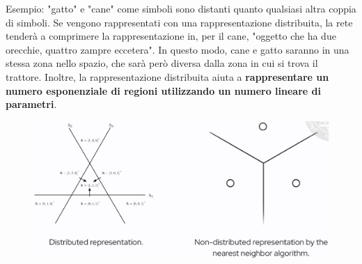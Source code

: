 Esempio: "gatto" e "cane" come simboli sono distanti quanto qualsiasi altra coppia di simboli. Se vengono 
rappresentati con una rappresentazione distribuita, la rete tenderà a comprimere la rappresentazione in, per
il cane, "oggetto che ha due orecchie, quattro zampre eccetera". In questo modo, cane e gatto saranno in una
stessa zona nello spazio, che sarà però diversa dalla zona in cui si trova il trattore.
\newline
\newline
Inoltre, la rappresentazione distribuita aiuta a \textbf{rappresentare un numero esponenziale di regioni 
utilizzando un numero lineare di parametri}.
\begin{figure}[!h]
  \centering
  \includegraphics[scale=.5]{images/representation_learning/representation.png}
\end{figure}




